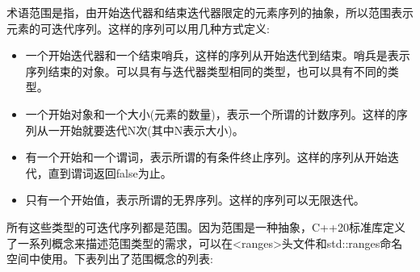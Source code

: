 
术语范围是指，由开始迭代器和结束迭代器限定的元素序列的抽象，所以范围表示元素的可迭代序列。这样的序列可以用几种方式定义:

\begin{itemize}
\item
一个开始迭代器和一个结束哨兵，这样的序列从开始迭代到结束。哨兵是表示序列结束的对象。可以具有与迭代器类型相同的类型，也可以具有不同的类型。

\item
一个开始对象和一个大小(元素的数量)，表示一个所谓的计数序列。这样的序列从一开始就要迭代N次(其中N表示大小)。

\item
有一个开始和一个谓词，表示所谓的有条件终止序列。这样的序列从开始迭代，直到谓词返回false为止。

\item
只有一个开始值，表示所谓的无界序列。这样的序列可以无限迭代。
\end{itemize}

所有这些类型的可迭代序列都是范围。因为范围是一种抽象，C++20标准库定义了一系列概念来描述范围类型的需求，可以在<ranges>头文件和std::ranges命名空间中使用。下表列出了范围概念的列表:

